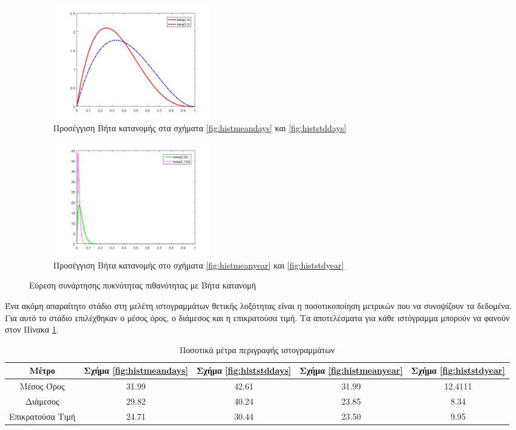 \begin{figure}[ht!]
 \begin{subfigure}[b]{0.5\textwidth}
 \includegraphics[width=70mm, height=50mm]{../../plots/Consumption_Analysis/beta_days_plot.png}
\caption{Προσέγγιση Βήτα κατανομής στα σχήματα \ref{fig:histmeandays} και \ref{fig:histstddays}}
\label{fig:betadays}
 \end{subfigure}
 \quad
 \begin{subfigure}[b]{0.5\textwidth}
 \includegraphics[width=70mm, height=50mm]{../../plots/Consumption_Analysis/beta_year_plot.png}
\caption{Προσέγγιση Βήτα κατανομής στο σχήματα \ref{fig:histmeanyear} και \ref{fig:histstdyear}}
\label{fig:betadays}
 \end{subfigure}
	\caption{Εύρεση συνάρτησης πυκνότητας πιθανότητας με Βήτα κατανομή}
	\label{fig:betapdfs}
	\end{figure}

Ένα ακόμη απαραίτητο στάδιο στη μελέτη ιστογραμμάτων θετικής λοξότητας είναι η ποσοτικοποίηση μετρικών που να συνοψίζουν τα δεδομένα. Για αυτό το στάδιο επιλέχθηκαν ο μέσος όρος, ο διάμεσος και η επικρατούσα τιμή. Τα αποτελέσματα για κάθε ιστόγραμμα μπορούν να φανούν στον Πίνακα \ref{tab:metricshist}.

\begin{table}[ht!]
\centering
\begin{tabular}{ |c|c|c|c|c| }
 \hline
 Μέτρο & Σχήμα \ref{fig:histmeandays} & Σχήμα \ref{fig:histstddays} & Σχήμα \ref{fig:histmeanyear} & Σχήμα \ref{fig:histstdyear}\\
 \hline
 Μέσος Όρος   		&   31.99  & 42.61 &31.99 &12.4111\\
 \hline
  Διάμεσος   		&   29.82  & 40.24 &23.85 &8.34\\ 
  \hline
  Επικρατούσα Τιμή  &   24.71  & 30.44 &23.50&9.95\\ 
   \hline
\end{tabular}
\caption{Ποσοτικά μέτρα περιγραφής ιστογραμμάτων}
\label{tab:metricshist}
\end{table}

